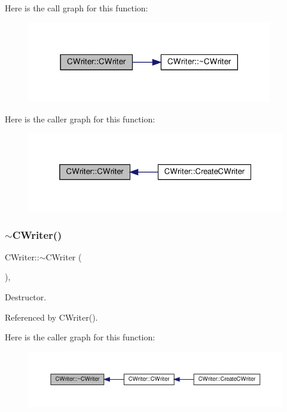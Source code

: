 Here is the call graph for this function\+:
\nopagebreak
\begin{figure}[H]
\begin{center}
\leavevmode
\includegraphics[width=302pt]{d3/d59/classCWriter_a22480a6c6f4c3b3bbb3efb886b5a724c_cgraph}
\end{center}
\end{figure}
Here is the caller graph for this function\+:
\nopagebreak
\begin{figure}[H]
\begin{center}
\leavevmode
\includegraphics[width=325pt]{d3/d59/classCWriter_a22480a6c6f4c3b3bbb3efb886b5a724c_icgraph}
\end{center}
\end{figure}
\mbox{\label{classCWriter_a4ce9be952a91f3422313a5f9faf60d99}} 
\subsubsection{\texorpdfstring{$\sim$\+C\+Writer()}{~CWriter()}}
{\footnotesize\ttfamily C\+Writer\+::$\sim$\+C\+Writer (\begin{DoxyParamCaption}{ }\end{DoxyParamCaption})\hspace{0.3cm}{\ttfamily [virtual]}, {\ttfamily [default]}}



Destructor. 



Referenced by C\+Writer().

Here is the caller graph for this function\+:
\nopagebreak
\begin{figure}[H]
\begin{center}
\leavevmode
\includegraphics[width=350pt]{d3/d59/classCWriter_a4ce9be952a91f3422313a5f9faf60d99_icgraph}
\end{center}
\end{figure}


